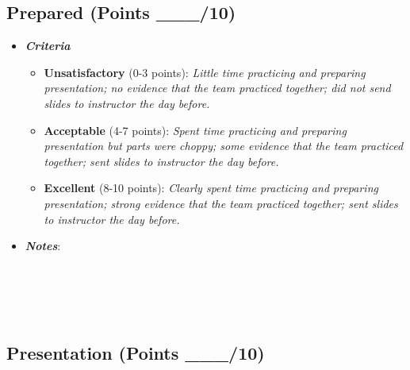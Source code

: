 \documentclass[
]{article}
\providecommand{\tightlist}{%
  \setlength{\itemsep}{0pt}\setlength{\parskip}{0pt}}
\begin{document}
\hypertarget{prepared-points-___10}{%
\subsection{Prepared (Points \_\_\_/10)}\label{prepared-points-___10}}

\begin{itemize}
\tightlist
\item
  \textbf{\emph{Criteria}}

  \begin{itemize}
  \tightlist
  \item
    \textbf{Unsatisfactory} (0-3 points): \emph{Little time practicing
    and preparing presentation; no evidence that the team practiced
    together; did not send slides to instructor the day before.}
  \item
    \textbf{Acceptable} (4-7 points): \emph{Spent time practicing and
    preparing presentation but parts were choppy; some evidence that the
    team practiced together; sent slides to instructor the day before.}
  \item
    \textbf{Excellent} (8-10 points): \emph{Clearly spent time
    practicing and preparing presentation; strong evidence that the team
    practiced together; sent slides to instructor the day before.}
  \end{itemize}
\item
  \textbf{\emph{Notes}}:
\end{itemize}

\begin{verbatim}
  
  
  
  
\end{verbatim}

\pagebreak

\hypertarget{presentation-points-___10}{%
\subsection{Presentation (Points
\_\_\_/10)}\label{presentation-points-___10}}
\end{document}
